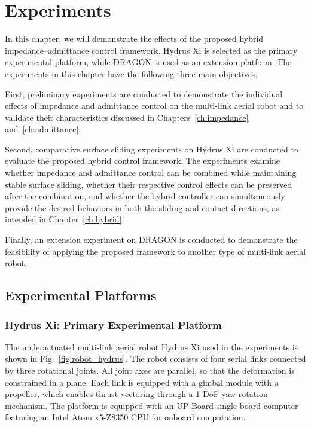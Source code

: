 \chapter{Experiments}
In this chapter, we will demonstrate the effects of the proposed hybrid impedance--admittance control framework. Hydrus Xi is selected as the primary experimental platform, while DRAGON is used as an extension platform. The experiments in this chapter have the following three main objectives. 

First, preliminary experiments are conducted to demonstrate the individual effects of impedance and admittance control on the multi-link aerial robot and to validate their characteristics discussed in Chapters~\ref{ch:impedance} and~\ref{ch:admittance}.

Second, comparative surface sliding experiments on Hydrus Xi are conducted to evaluate the proposed hybrid control framework. The experiments examine whether impedance and admittance control can be combined while maintaining stable surface sliding, whether their respective control effects can be preserved after the combination, and whether the hybrid controller can simultaneously provide the desired behaviors in both the sliding and contact directions, as intended in Chapter~\ref{ch:hybrid}.

Finally, an extension experiment on DRAGON is conducted to demonstrate the feasibility of applying the proposed framework to another type of multi-link aerial robot.

\section{Experimental Platforms}

\subsection{Hydrus Xi: Primary Experimental Platform}
The underactuated multi-link aerial robot Hydrus Xi used in the experiments is shown in Fig.~\ref{fig:robot_hydrus}. The robot consists of four serial links connected by three rotational joints. All joint axes are parallel, so that the deformation is constrained in a plane. Each link is equipped with a gimbal module with a propeller, which enables thrust vectoring through a 1-DoF yaw rotation mechanism. The platform is equipped with an UP-Board single-board computer featuring an Intel Atom x5-Z8350 CPU for onboard computation.

